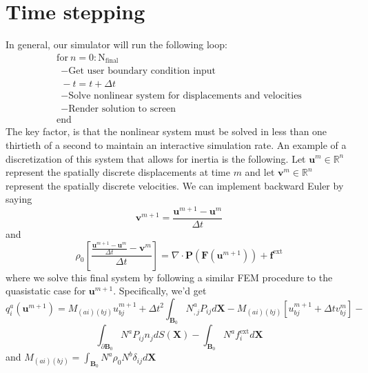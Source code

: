 \documentclass[article]{pcms-l}
\begin{document}
\section*{Time stepping}
In general, our simulator will run the following loop:
$$
\begin{array}{lc}
\textrm{for} \ n=0:\textrm{N}_\textrm{final}\\
\ \ -\textrm{Get user boundary condition input}\\
\ \ -t=t+\Delta{t}\\
\ \ -\textrm{Solve nonlinear system for displacements and velocities}\\
\ \ -\textrm{Render solution to screen}\\
\textrm{end}
 \end{array}
$$
The key factor, is that the nonlinear system must be solved in less than one thirtieth of a second to maintain an interactive simulation rate. An example of a discretization of this system that allows for inertia is the following. Let $\mathbf{u}^m\in\mathbb{R}^n$ represent the spatially discrete displacements at time $m$ and let $\mathbf{v}^m\in\mathbb{R}^n$ represent the spatially discrete velocities. We can implement backward Euler by saying
$$
\mathbf{v}^{m+1}=\frac{\mathbf{u}^{m+1}-\mathbf{u}^{m}}{\Delta{t}}
$$
and
$$
\rho_0\left[\frac{\frac{\mathbf{u}^{m+1}-\mathbf{u}^{m}}{\Delta{t}}-\mathbf{v}^{m}}{\Delta{t}}\right]=\nabla\cdot\mathbf{P}(\mathbf{F}(\mathbf{u}^{m+1}))+\mathbf{f}^\textrm{ext}
$$
where we solve this final system by following a similar FEM procedure to the quasistatic case for $\mathbf{u}^{m+1}$. Specifically, we'd get 
$$
q^a_i(\mathbf{u}^{m+1})=M_{(ai)(bj)}u^{m+1}_{bj}+\Delta{t}^2\int_{\mathbf{B}_0}N^a_{,j}P_{ij}d\mathbf{X}-M_{(ai)(bj)}\left[u^{m+1}_{bj}+\Delta{t}v^{m}_{bj}\right]-
$$
$$
\int_{\partial\mathbf{B}_0}N^aP_{ij}n_jdS(\mathbf{X})-\int_{\mathbf{B}_0}N^af^\textrm{ext}_id\mathbf{X}
$$
and $M_{(ai)(bj)}=\int_{\mathbf{B}_0}N^a\rho_0N^b\delta_{ij}d\mathbf{X}$

%

\end{document}
